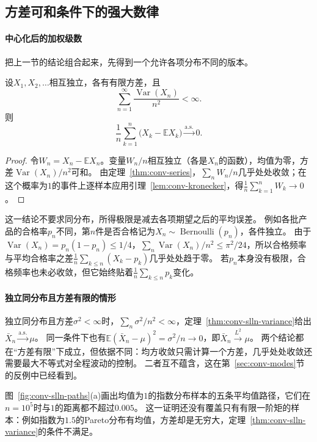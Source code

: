\subsection{方差可和条件下的强大数律}

\paragraph{中心化后的加权级数}
把上一节的结论组合起来，先得到一个允许各项分布不同的版本。

\begin{theorem}[方差可和条件下的强大数律]
\label{thm:conv-slln-variance}
设$X_1,X_2,\ldots$相互独立，各有有限方差，且
\[
  \sum_{n=1}^{\infty}\frac{\operatorname{Var}(X_n)}{n^2}<\infty.
\]
则
\[
  \frac1n\sum_{k=1}^n\bigl(X_k-\mathbb EX_k\bigr)\xrightarrow{\mathrm{a.s.}}0.
\]
\end{theorem}

\begin{proof}
令$W_n=X_n-\mathbb EX_n$。变量$W_n/n$相互独立（各是$X_n$的函数），均值为零，方差$\operatorname{Var}(X_n)/n^2$可和。
由定理~\ref{thm:conv-series}，$\sum_nW_n/n$几乎处处收敛；在这个概率为$1$的事件上逐样本应用引理~\ref{lem:conv-kronecker}，得$\frac1n\sum_{k=1}^nW_k\to0$。
\end{proof}

这一结论不要求同分布，所得极限是减去各项期望之后的平均误差。
例如各批产品的合格率$p_n$不同，第$n$件是否合格记为$X_n\sim\operatorname{Bernoulli}(p_n)$，各件独立。
由于$\operatorname{Var}(X_n)=p_n(1-p_n)\leq1/4$，$\sum_n\operatorname{Var}(X_n)/n^2\leq\pi^2/24$，所以合格频率与平均合格率之差$\frac1n\sum_{k\leq n}(X_k-p_k)$几乎处处趋于零。
若$p_n$本身没有极限，合格频率也未必收敛，但它始终贴着$\frac1n\sum_{k\leq n}p_k$变化。

\paragraph{独立同分布且方差有限的情形}
独立同分布且方差$\sigma^2<\infty$时，$\sum_n\sigma^2/n^2<\infty$，定理~\ref{thm:conv-slln-variance}给出$\bar X_n\xrightarrow{\mathrm{a.s.}}\mu$。
同一条件下也有$\mathbb E(\bar X_n-\mu)^2=\sigma^2/n\to0$，即$\bar X_n\xrightarrow{L^2}\mu$。
两个结论都在“方差有限”下成立，但依据不同：均方收敛只需计算一个方差，几乎处处收敛还需要最大不等式对全程波动的控制。
二者互不蕴含，这在第~\ref{sec:conv-modes}节的反例中已经看到。

图~\ref{fig:conv-slln-paths}(a)画出均值为$1$的指数分布样本的五条平均值路径，它们在$n=10^5$时与$1$的距离都不超过$0.005$。
这一证明还没有覆盖只有有限一阶矩的样本：例如指数为$1.5$的Pareto分布有均值，方差却是无穷大，定理~\ref{thm:conv-slln-variance}的条件不满足。

